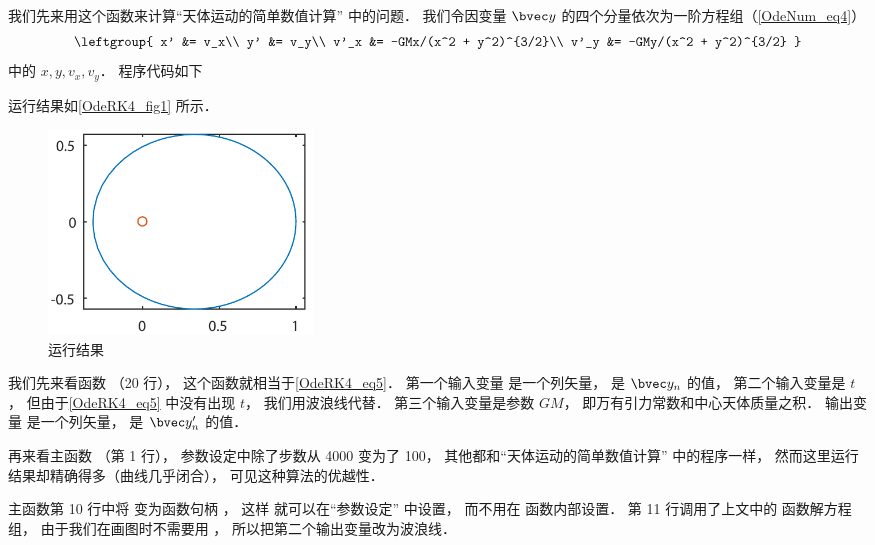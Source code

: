 我们先来用这个函数来计算“天体运动的简单数值计算” 中的问题． 我们令因变量 $\bvec y$ 的四个分量依次为一阶方程组（\autoref{OdeNum_eq4}）
\begin{equation}\label{OdeRK4_eq5}
\leftgroup{
x' &= v_x\\
y' &= v_y\\
v'_x &= -GMx/(x^2 + y^2)^{3/2}\\
v'_y &= -GMy/(x^2 + y^2)^{3/2}
}\end{equation}
中的 $x, y, v_x, v_y$． 程序代码如下


运行结果如\autoref{OdeRK4_fig1} 所示．

\begin{figure}[ht]
\centering
\includegraphics[width=7cm]{./figures/OdeRK41.pdf}
\caption{运行结果} \label{OdeRK4_fig1}
\end{figure}

我们先来看函数  （20 行）， 这个函数就相当于\autoref{OdeRK4_eq5}． 第一个输入变量  是一个列矢量， 是 $\bvec y_n$ 的值， 第二个输入变量是 $t$， 但由于\autoref{OdeRK4_eq5} 中没有出现 $t$， 我们用波浪线代替． 第三个输入变量是参数 $GM$， 即万有引力常数和中心天体质量之积． 输出变量  是一个列矢量， 是 $\bvec y'_n$ 的值．

再来看主函数  （第 1 行）， 参数设定中除了步数从 4000 变为了 100， 其他都和“天体运动的简单数值计算” 中的程序一样， 然而这里运行结果却精确得多（曲线几乎闭合）， 可见这种算法的优越性．

主函数第 10 行中将  变为函数句柄 ， 这样  就可以在“参数设定” 中设置， 而不用在  函数内部设置． 第 11 行调用了上文中的  函数解方程组， 由于我们在画图时不需要用 ， 所以把第二个输出变量改为波浪线．
